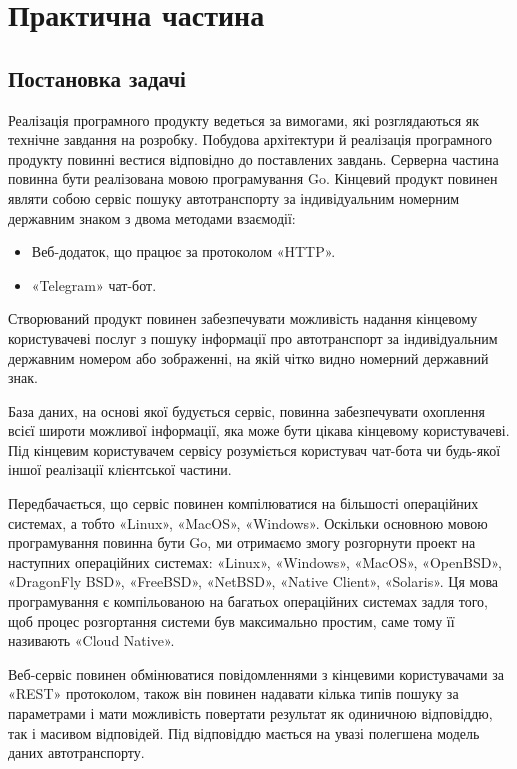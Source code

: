 
\chapter{Практична частина}

\section{Постановка задачі}

Реалізація програмного продукту ведеться за вимогами, які розглядаються як технічне завдання на розробку. Побудова архітектури й реалізація програмного
продукту повинні вестися відповідно до поставлених завдань.
Серверна частина повинна бути реалізована мовою програмування Go.
Кінцевий продукт повинен являти собою сервіс пошуку автотранспорту
за індивідуальним номерним державним знаком з двома методами
взаємодії:

\begin{itemize}
  \item Веб-додаток, що працює за протоколом «HTTP».
  \item «Telegram» чат-бот.
\end{itemize}

Створюваний продукт повинен забезпечувати можливість
надання кінцевому користувачеві послуг з пошуку інформації про
автотранспорт за індивідуальним державним номером
або зображенні, на якій чітко видно номерний державний знак.

База даних, на основі якої будується сервіс, повинна
забезпечувати охоплення всієї широти можливої ​​інформації, яка може бути
цікава кінцевому користувачеві. Під кінцевим користувачем сервісу
розуміється користувач чат-бота чи будь-якої іншої реалізації клієнтської частини.

Передбачається, що сервіс повинен компілюватися на більшості операційних системах,
а тобто «Linux», «MacOS», «Windows».
Оскільки основною мовою програмування повинна бути Go, ми отримаємо змогу
розгорнути проект на наступних операційних системах:
«Linux», «Windows», «MacOS», «OpenBSD», «DragonFly BSD», «FreeBSD», «NetBSD», «Native Client», «Solaris».
Ця мова програмування є компільованою на багатьох операційних системах задля того, щоб процес розгортання
системи був максимально простим, саме тому її називають «Cloud Native».

Веб-сервіс повинен обмінюватися повідомленнями з кінцевими
користувачами за «REST» протоколом, також він повинен
надавати кілька типів пошуку за параметрами і мати можливість
повертати результат як одиничною відповіддю, так і масивом відповідей.
Під відповіддю мається на увазі полегшена модель даних автотранспорту.

